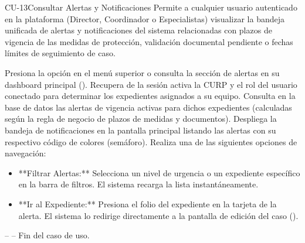 \begin{UseCase}{CU-13}{Consultar Alertas y Notificaciones}{
	Permite a cualquier usuario autenticado en la plataforma (Director, Coordinador o Especialistas) visualizar la bandeja unificada de alertas y notificaciones del sistema relacionadas con plazos de vigencia de las medidas de protección, validación documental pendiente o fechas límites de seguimiento de caso.
}
\end{UseCase}

\begin{UCtrayectoria}
	\UCpaso[\UCactor] Presiona la opción  en el menú superior o consulta la sección de alertas en su dashboard principal ().
	\UCpaso Recupera de la sesión activa la CURP y el rol del usuario conectado para determinar los expedientes asignados a su equipo.
	\UCpaso Consulta en la base de datos las alertas de vigencia activas para dichos expedientes (calculadas según la regla de negocio de plazos de medidas y documentos).
	\UCpaso Despliega la bandeja de notificaciones en la pantalla principal listando las alertas con su respectivo código de colores (semáforo).
	\UCpaso[\UCactor] Realiza una de las siguientes opciones de navegación:
		\begin{itemize}
			\item **Filtrar Alertas:** Selecciona un nivel de urgencia o un expediente específico en la barra de filtros. El sistema recarga la lista instantáneamente.
			\item **Ir al Expediente:** Presiona el folio del expediente en la tarjeta de la alerta. El sistema lo redirige directamente a la pantalla de edición del caso ().
		\end{itemize}
	\UCpaso[] -- -- Fin del caso de uso.
\end{UCtrayectoria}
